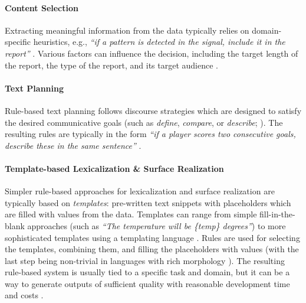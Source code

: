 {\paragraph{Content Selection}
Extracting meaningful information from the data typically relies on domain-specific heuristics, e.g., \textit{``if a pattern is detected in the signal, include it in the report''} \cite{portet2009automatic}. Various factors can influence the decision, including the target length of the report, the type of the report, and its target audience \cite{gkatziaContentSelectionDatatoText2016}.

\paragraph{Text Planning} Rule-based text planning follows discourse strategies which are designed to satisfy the desired communicative goals (such as \emph{define}, \emph{compare}, or \emph{describe}; \citealp{mckeown1985text}). The resulting rules are typically in the form \textit{``if a player scores two consecutive goals, describe these in the same sentence''}  \cite{gattSurveyStateArt2018}.


\paragraph{Template-based Lexicalization \& Surface Realization}
Simpler rule-based approaches for lexicalization and surface realization are typically based on \emph{templates}: pre-written text snippets with placeholders which are filled with values from the data. Templates can range from simple fill-in-the-blank approaches (such as \textit{``The temperature will be \{temp\} degrees''}) to more sophisticated templates using a templating language \cite{gatt2009simplenlg,reiter2016nlg}.  Rules are used for selecting the templates, combining them, and filling the placeholders with values (with the last step being non-trivial in languages with rich morphology \cite{duvsek2019neural}). The resulting rule-based system is usually tied to a specific task and domain, but it can be a way to generate outputs of sufficient quality with reasonable development time and costs \cite{vanderleeAutomatedLearningTemplates2018}.


}
